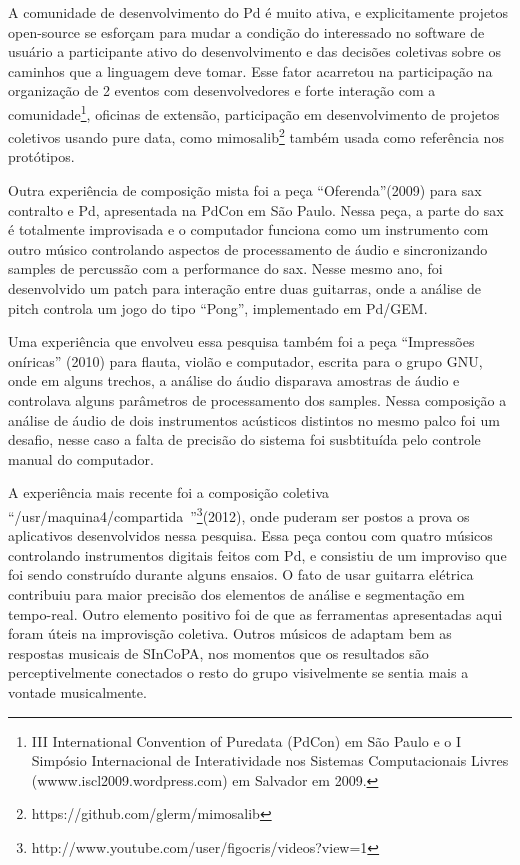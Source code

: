 \documentclass{ppgmus}
\begin{document}
A comunidade de desenvolvimento do Pd é muito ativa, e explicitamente projetos open-source
se esforçam para mudar a condição do interessado no software de usuário a participante ativo do desenvolvimento
e das decisões coletivas sobre os caminhos que a linguagem deve tomar. Esse  fator acarretou na participação na
organização de 2 eventos com desenvolvedores e forte interação com a comunidade\footnote{III International
Convention of Puredata (PdCon) em São Paulo e o I Simpósio Internacional de Interatividade nos Sistemas
Computacionais Livres (wwww.iscl2009.wordpress.com) em Salvador em 2009.}, oficinas de extensão, 
participação em desenvolvimento de projetos coletivos usando pure data, como mimosalib\footnote
{https://github.com/glerm/mimosalib} também usada como referência nos protótipos.

Outra experiência de composição mista foi a peça ``Oferenda''(2009) para sax contralto e Pd, 
apresentada na PdCon em São Paulo. Nessa peça, a parte do sax é totalmente improvisada e 
o computador funciona como um instrumento com outro músico controlando aspectos de 
processamento de áudio e sincronizando samples de percussão com a performance do sax. 
Nesse mesmo ano, foi desenvolvido um patch para interação entre duas guitarras, onde a
análise de pitch controla um jogo do tipo ``Pong'', implementado em Pd/GEM. 

Uma experiência que envolveu essa pesquisa também foi a peça ``Impressões oníricas'' (2010) para flauta,
violão e computador, escrita para o grupo GNU, onde em alguns trechos, a análise do áudio
disparava amostras de áudio e controlava alguns parâmetros de processamento dos samples. 
Nessa composição a análise de áudio de dois instrumentos acústicos distintos no mesmo palco foi 
um desafio, nesse caso a falta de precisão do sistema foi susbtituída pelo controle manual
do computador.

A experiência mais recente foi a composição coletiva ``/usr/maquina4/compartida~''\footnote
{http://www.youtube.com/user/figocris/videos?view=1}(2012), onde puderam
ser postos a prova os aplicativos desenvolvidos nessa pesquisa. Essa peça contou com quatro
músicos controlando instrumentos digitais feitos com Pd, e consistiu de um improviso que foi
sendo construído durante alguns ensaios. O fato de usar guitarra elétrica
contribuiu para maior precisão dos elementos de análise e segmentação em tempo-real.
Outro elemento positivo foi de que as ferramentas apresentadas aqui foram úteis na 
improvisção coletiva. Outros músicos de adaptam bem as respostas musicais de SInCoPA, nos momentos que 
os resultados são perceptivelmente conectados o resto do grupo visivelmente se sentia mais
a vontade musicalmente.
\end{document}
